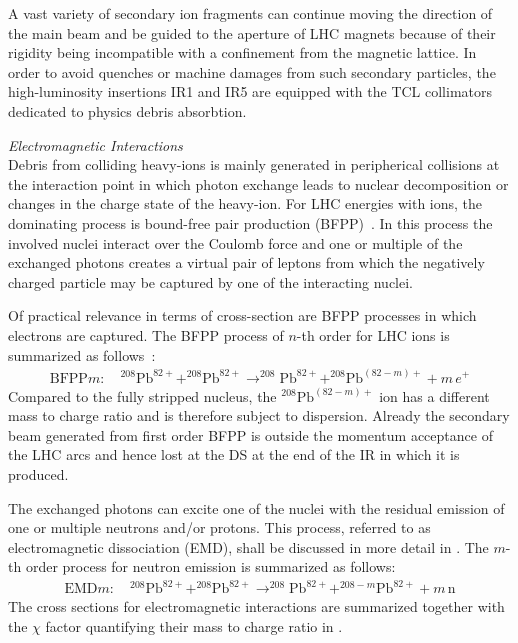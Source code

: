 A vast variety of secondary ion fragments can continue moving the direction of the main beam and be guided to the aperture of LHC magnets because of their rigidity being incompatible with a confinement from the magnetic lattice. In order to avoid quenches or machine damages from such secondary particles, the high-luminosity insertions IR1 and IR5 are equipped with the TCL collimators dedicated to physics debris absorbtion. 



\textit{Electromagnetic Interactions}\\
Debris from colliding heavy-ions is mainly generated in peripherical collisions at the interaction point in which photon exchange leads to nuclear decomposition or changes in the charge state of the heavy-ion. For LHC energies with \lead ions, the dominating process is bound-free pair production (BFPP)~\cite{}. In this process the involved nuclei interact over the Coulomb force and one or multiple of the exchanged photons creates a virtual pair of leptons from which the negatively charged particle may be captured by one of the interacting nuclei. 

Of practical relevance in terms of cross-section are BFPP processes in which electrons are captured. The BFPP process of $n$-th order for LHC \lead ions is summarized as follows~\cite{BFPP1}:
%
\begin{align}
  \text{BFPP}m:  \quad ^{208}\text{Pb}^{82+} + ^{208}\text{Pb}^{82+} \rightarrow ^{208}\text{Pb}^{82+} + ^{208}\text{Pb}^{(82-m)+} + m \, e^+
\end{align}
%
Compared to the fully stripped nucleus, the $^{208}\text{Pb}^{(82-m)+}$ ion has a different mass to charge ratio and is therefore subject to dispersion. Already the secondary beam generated from first order BFPP is outside the momentum acceptance of the LHC arcs and hence lost at the DS at the end of the IR in which it is produced. 

The exchanged photons can excite one of the nuclei with the residual emission of one or multiple neutrons and/or protons. This process, referred to as electromagnetic dissociation (EMD), shall be discussed in more detail in . The $m$-th order process for neutron emission is summarized as follows:
%
\begin{align}
   \text{EMD}m:  \quad ^{208}\text{Pb}^{82+} + ^{208}\text{Pb}^{82+} \rightarrow ^{208}\text{Pb}^{82+} + ^{208-m}\text{Pb}^{82+} + m \, \text{n}
\end{align}
%
The cross sections for electromagnetic interactions are summarized together with the $\chi$ factor quantifying their mass to charge ratio in . 


